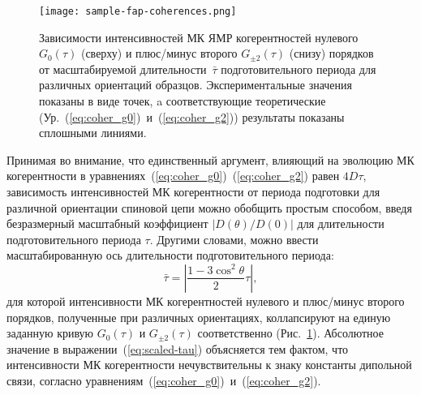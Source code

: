 \begin{figure}[H]
  \centering
  \texttt{[image: sample-fap-coherences.png]}
  \caption{
    Зависимости интенсивностей МК ЯМР когерентностей нулевого $G_0(\tau)$ (сверху) и плюс/минус второго $G_{\pm2}(\tau)$ (снизу) порядков
    от масштабируемой длительности~$\bar\tau$ подготовительного периода для различных ориентаций образцов.
    Экспериментальные значения показаны в виде точек,
    a соответствующие теоретические (Ур.~(\ref{eq:coher_g0})~и~(\ref{eq:coher_g2})) результаты показаны сплошными линиями.
  }
  \label{fig:sample-fap-coherences}
\end{figure}

Принимая во внимание, что единственный аргумент, влияющий на эволюцию МК когерентности в уравнениях~(\ref{eq:coher_g0})~(\ref{eq:coher_g2}) равен $4D\tau$,
зависимость интенсивностей МК когерентности от периода подготовки для различной ориентации спиновой цепи можно обобщить простым способом\cite{Bochkin2019jmr},
введя безразмерный масштабный коэффициент $|D(\theta)/D (0)|$ для длительности подготовительного периода $\tau$.
Другими словами, можно ввести масштабированную ось длительности подготовительного периода:
%
\begin{equation}\label{eq:scaled-tau}
 \bar\tau = \left| \dfrac{1 - 3\cos^2{\theta}}{2} \tau \right|,
\end{equation}
%
для которой интенсивности МК когерентностей нулевого и плюс/минус второго порядков,
полученные при различных ориентациях,
коллапсируют на единую заданную кривую $G_0(\tau)$ и $G_{\pm 2}(\tau)$ соответственно (Рис.~\ref{fig:sample-fap-coherences}).
Абсолютное значение в выражении~(\ref{eq:scaled-tau}) объясняется тем фактом,
что интенсивности МК когерентности нечувствительны к знаку константы дипольной связи,
согласно уравнениям~(\ref{eq:coher_g0})~и~(\ref{eq:coher_g2}).

